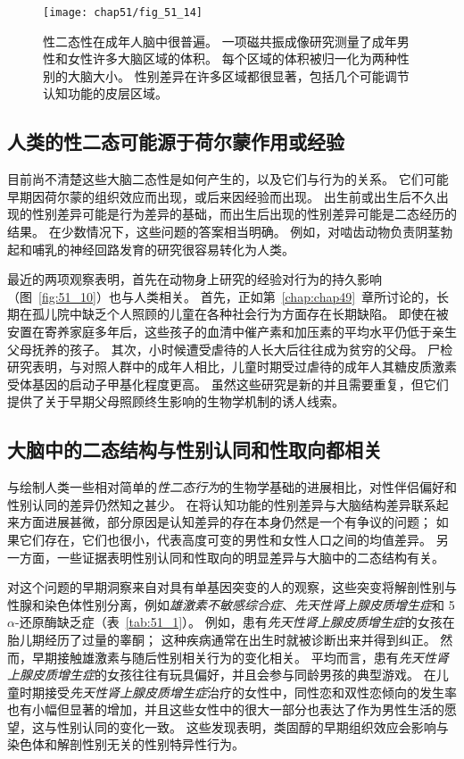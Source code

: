 \begin{figure}[htbp]
	\centering
	\texttt{[image: chap51/fig\_51\_14]}
	\caption{性二态性在成年人脑中很普遍。
		一项磁共振成像研究测量了成年男性和女性许多大脑区域的体积。
		每个区域的体积被归一化为两种性别的大脑大小。
		性别差异在许多区域都很显著，包括几个可能调节认知功能的皮层区域\cite{cahill2006sex}。 }
	\label{fig:51_14}
\end{figure}



\subsection{人类的性二态可能源于荷尔蒙作用或经验}

目前尚不清楚这些大脑二态性是如何产生的，以及它们与行为的关系。
它们可能早期因荷尔蒙的组织效应而出现，或后来因经验而出现。
出生前或出生后不久出现的性别差异可能是行为差异的基础，而出生后出现的性别差异可能是二态经历的结果。
在少数情况下，这些问题的答案相当明确。
例如，对啮齿动物负责阴茎勃起和哺乳的神经回路发育的研究很容易转化为人类。


最近的两项观察表明，首先在动物身上研究的经验对行为的持久影响（图~\ref{fig:51_10}）也与人类相关。
首先，正如第~\ref{chap:chap49}~章所讨论的，长期在孤儿院中缺乏个人照顾的儿童在各种社会行为方面存在长期缺陷。
即使在被安置在寄养家庭多年后，这些孩子的血清中催产素和加压素的平均水平仍低于亲生父母抚养的孩子。
其次，小时候遭受虐待的人长大后往往成为贫穷的父母。
尸检研究表明，与对照人群中的成年人相比，儿童时期受过虐待的成年人其糖皮质激素受体基因的启动子甲基化程度更高。
虽然这些研究是新的并且需要重复，但它们提供了关于早期父母照顾终生影响的生物学机制的诱人线索。



\subsection{大脑中的二态结构与性别认同和性取向都相关}

与绘制人类一些相对简单的\textit{性二态行为}的生物学基础的进展相比，对性伴侣偏好和性别认同的差异仍然知之甚少。
在将认知功能的性别差异与大脑结构差异联系起来方面进展甚微，部分原因是认知差异的存在本身仍然是一个有争议的问题；
如果它们存在，它们也很小，代表高度可变的男性和女性人口之间的均值差异。
另一方面，一些证据表明性别认同和性取向的明显差异与大脑中的二态结构有关。


对这个问题的早期洞察来自对具有单基因突变的人的观察，这些突变将解剖性别与性腺和染色体性别分离，例如\textit{雄激素不敏感综合症}、\textit{先天性肾上腺皮质增生症}和 5$\alpha$-还原酶缺乏症（表~\ref{tab:51_1}）。
例如，患有\textit{先天性肾上腺皮质增生症}的女孩在胎儿期经历了过量的睾酮；
这种疾病通常在出生时就被诊断出来并得到纠正。
然而，早期接触雄激素与随后性别相关行为的变化相关。
平均而言，患有\textit{先天性肾上腺皮质增生症}的女孩往往有玩具偏好，并且会参与同龄男孩的典型游戏。
在儿童时期接受\textit{先天性肾上腺皮质增生症}治疗的女性中，同性恋和双性恋倾向的发生率也有小幅但显著的增加，并且这些女性中的很大一部分也表达了作为男性生活的愿望，这与性别认同的变化一致。
这些发现表明，类固醇的早期组织效应会影响与染色体和解剖性别无关的性别特异性行为。


